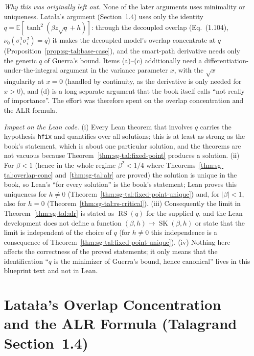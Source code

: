 \begin{remark}
\emph{Why this was originally left out.} None of the later arguments uses minimality or uniqueness. Lata\l{}a's argument (Section~1.4) uses only the identity $q=\mathbb{E}[\tanh^2(\beta z\sqrt q+h)]$: through the decoupled overlap (Eq.~(1.104), $\nu_0(\sigma^1_i\sigma^2_i)=q$) it makes the decoupled model's overlap concentrate at $q$ (Proposition~\ref{prop:sg-tal:base-case}), and the smart-path derivative needs only the generic $q$ of Guerra's bound. Items (a)--(c) additionally need a differentiation-under-the-integral argument in the variance parameter $x$, with the $\sqrt x$ singularity at $x=0$ (handled by continuity, as the derivative is only needed for $x>0$), and (d) is a long separate argument that the book itself calls ``not really of importance''. The effort was therefore spent on the overlap concentration and the ALR formula.

\emph{Impact on the Lean code.} (i) Every Lean theorem that involves $q$ carries the hypothesis \texttt{hfix} and quantifies over all solutions; this is at least as strong as the book's statement, which is about one particular solution, and the theorems are not vacuous because Theorem~\ref{thm:sg-tal:fixed-point} produces a solution. (ii) For $\beta<1$ (hence in the whole regime $\beta^2<1/4$ where Theorems~\ref{thm:sg-tal:overlap-conc} and~\ref{thm:sg-tal:alr} are proved) the solution is unique in the book, so Lean's ``for every solution'' is the book's statement; Lean proves this uniqueness for $h\ne0$ (Theorem~\ref{thm:sg-tal:fixed-point-unique}) and, for $|\beta|<1$, also for $h=0$ (Theorem~\ref{thm:sg-tal:rs-critical}). (iii) Consequently the limit in Theorem~\ref{thm:sg-tal:alr} is stated as $\operatorname{RS}(q)$ for the supplied $q$, and the Lean development does not define a function $(\beta,h)\mapsto\operatorname{SK}(\beta,h)$ or state that the limit is independent of the choice of $q$ (for $h\ne0$ this independence is a consequence of Theorem~\ref{thm:sg-tal:fixed-point-unique}). (iv) Nothing here affects the correctness of the proved statements; it only means that the identification ``$q$ is the minimizer of Guerra's bound, hence canonical'' lives in this blueprint text and not in Lean.
\end{remark}

\section{Lata\l{}a's Overlap Concentration and the ALR Formula (Talagrand Section~1.4)}\label{sec:sg-tal:latala-alr}

